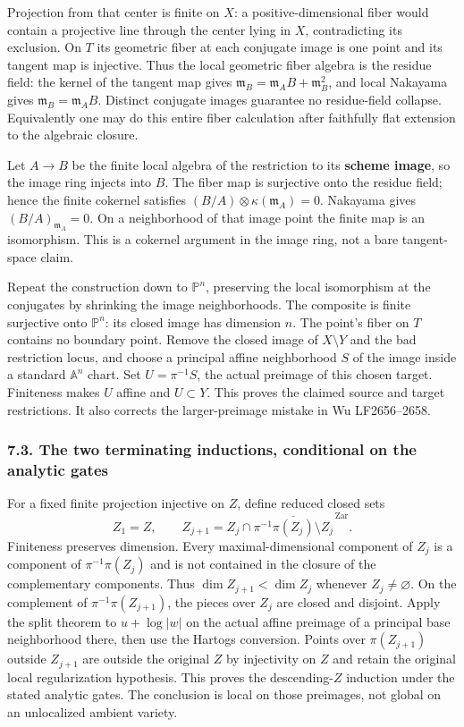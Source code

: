 \documentclass[
  10pt,
]{article}
\begin{document}
Projection from that center is finite on \(X\): a positive-dimensional
fiber would contain a projective line through the center lying in \(X\),
contradicting its exclusion. On \(T\) its geometric fiber at each
conjugate image is one point and its tangent map is injective. Thus the
local geometric fiber algebra is the residue field: the kernel of the
tangent map gives \(\mathfrak m_B=\mathfrak m_A B+\mathfrak m_B^2\), and
local Nakayama gives \(\mathfrak m_B=\mathfrak m_A B\). Distinct
conjugate images guarantee no residue-field collapse. Equivalently one
may do this entire fiber calculation after faithfully flat extension to
the algebraic closure.

Let \(A\to B\) be the finite local algebra of the restriction to its
\textbf{scheme image}, so the image ring injects into \(B\). The fiber
map is surjective onto the residue field; hence the finite cokernel
satisfies \((B/A)\otimes\kappa(\mathfrak m_A)=0\). Nakayama gives
\((B/A)_{\mathfrak m_A}=0\). On a neighborhood of that image point the
finite map is an isomorphism. This is a cokernel argument in the image
ring, not a bare tangent-space claim.

Repeat the construction down to \(\mathbb P^n\), preserving the local
isomorphism at the conjugates by shrinking the image neighborhoods. The
composite is finite surjective onto \(\mathbb P^n\): its closed image
has dimension \(n\). The point's fiber on \(T\) contains no boundary
point. Remove the closed image of \(X\setminus Y\) and the bad
restriction locus, and choose a principal affine neighborhood \(S\) of
the image inside a standard \(\mathbb A^n\) chart. Set
\textbf{\(U=\pi^{-1}S\)}, the actual preimage of this chosen target.
Finiteness makes \(U\) affine and \(U\subset Y\). This proves the
claimed source and target restrictions. It also corrects the
larger-preimage mistake in Wu LF2656--2658.

\subsubsection{7.3. The two terminating inductions, conditional on the
analytic
gates}\label{the-two-terminating-inductions-conditional-on-the-analytic-gates}

For a fixed finite projection injective on \(Z\), define reduced closed
sets
\[Z_1=Z,\qquad Z_{j+1}=Z_j\cap\overline{\pi^{-1}\pi(Z_j)\setminus Z_j}^{\,\mathrm{Zar}}. \tag{7.3}\]
Finiteness preserves dimension. Every maximal-dimensional component of
\(Z_j\) is a component of \(\pi^{-1}\pi(Z_j)\) and is not contained in
the closure of the complementary components. Thus
\(\dim Z_{j+1}<\dim Z_j\) whenever \(Z_j\ne\varnothing\). On the
complement of \(\pi^{-1}\pi(Z_{j+1})\), the pieces over \(Z_j\) are
closed and disjoint. Apply the split theorem to \(u+\log|w|\) on the
actual affine preimage of a principal base neighborhood there, then use
the Hartogs conversion. Points over \(\pi(Z_{j+1})\) outside \(Z_{j+1}\)
are outside the original \(Z\) by injectivity on \(Z\) and retain the
original local regularization hypothesis. This proves the
descending-\(Z\) induction under the stated analytic gates. The
conclusion is local on those preimages, not global on an unlocalized
ambient variety.
\end{document}
